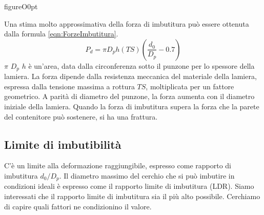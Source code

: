 \begin{wrapfloat}{figure}{O}{0pt}

\end{wrapfloat}

Una stima molto approssimativa della forza di imbutitura può essere ottenuta dalla formula \eqref{eqn:ForzeImbutitura}.
\begin{equation}
P_d = \pi D_p h (TS) \left(\frac{d_0}{D_p} - 0.7\right)
\label{eqn:ForzeImbutitura}
\end{equation}
$\pi$ $D_p$ $h$ è un'area, data dalla circonferenza sotto il punzone per lo spessore della lamiera. La forza dipende dalla resistenza meccanica del materiale della lamiera, espressa dalla tensione massima a rottura $TS$, moltiplicata per un fattore geometrico. A parità di diametro del punzone, la forza aumenta con il diametro iniziale della lamiera. Quando la forza di imbutitura supera la forza che la parete del contenitore può sostenere, si ha una frattura.

\subsection{Limite di imbutibilità}
C'è un limite alla deformazione raggiungibile, espresso come rapporto di imbutitura $d_0/D_p$.
Il diametro massimo del cerchio che si può imbutire in condizioni ideali è espresso come il rapporto limite di imbutitura (\ac{LDR}).
Siamo interessati che il rapporto limite di imbutitura sia il più alto possibile. Cerchiamo di 
capire quali fattori ne condizionino il valore.


